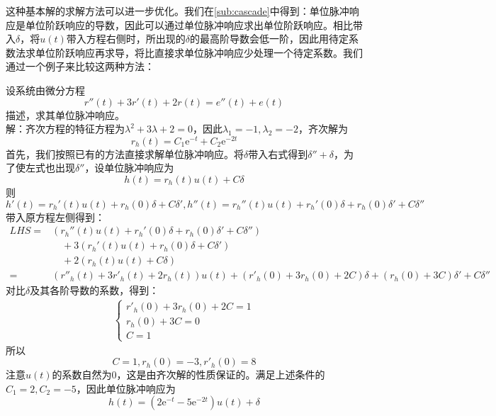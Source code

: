 \documentclass{ctexbook}
\begin{document}
这种基本解的求解方法可以进一步优化。我们在\ref{sub:cascade}中得到：单位脉冲响应是单位阶跃响应的导数，因此可以通过单位脉冲响应求出单位阶跃响应。相比带入$\delta$，将$u(t)$带入方程右侧时，所出现的$\delta$的最高阶导数会低一阶，因此用待定系数法求单位阶跃响应再求导，将比直接求单位脉冲响应少处理一个待定系数。我们通过一个例子来比较这两种方法：
\begin{example}
    设系统由微分方程\[r''(t)+3r'(t)+2r(t)=e''(t)+e(t)\]描述，求其单位脉冲响应。\\
    解：齐次方程的特征方程为$\lambda^2+3\lambda+2=0$，因此$\lambda_1=-1,\lambda_2=-2$，齐次解为$$r_h(t)=C_1 \mathrm{e}^{-t}+C_2 \mathrm{e}^{-2t}$$
    首先，我们按照已有的方法直接求解单位脉冲响应。将$\delta$带入右式得到$\delta''+\delta$，为了使左式也出现$\delta''$，设单位脉冲响应为$$h(t)=r_h(t)u(t)+C\delta$$
    则$$h'(t)=r_h'(t)u(t)+r_h(0)\delta+C\delta',h''(t)=r_h''(t)u(t)+r_h'(0)\delta+r_h(0)\delta'+C\delta''$$
    带入原方程左侧得到：\begin{align*}
        LHS=&\left(r_h''(t)u(t)+r_h'(0)\delta+r_h(0)\delta'+C\delta''\right)\\
        &\quad+3\left(r_h'(t)u(t)+r_h(0)\delta+C\delta'\right)\\
        &\quad+2\left(r_h(t)u(t)+C\delta\right)\\
        =&\left(r''_h(t)+3r'_h(t)+2r_h(t)\right)u(t)+\left(r'_h(0)+3r_h(0)+2C\right)\delta+\left(r_h(0)+3C\right)\delta'+C\delta''
    \end{align*}
    对比$\delta$及其各阶导数的系数，得到：\begin{align*}
        \begin{cases}
            r'_h(0)+3r_h(0)+2C=1\\
            r_h(0)+3C=0\\
            C=1
        \end{cases}
    \end{align*}
    所以$$C=1,r_h(0)=-3,r'_h(0)=8$$
    注意$u(t)$的系数自然为0，这是由齐次解的性质保证的。满足上述条件的$C_1=2,C_2=-5$，因此单位脉冲响应为
    $$h(t)=\left(2\mathrm{e}^{-t}-5\mathrm{e}^{-2t}\right)u(t)+\delta$$


\end{example}
\end{document}
